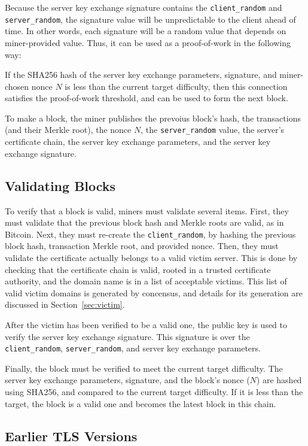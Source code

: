 Because the server key exchange signature contains the \texttt{client\_random}
and \texttt{server\_random}, the signature value will be unpredictable to the
client ahead of time. In other words, each signature will be a random value that
depends on miner-provided value. Thus, it can be used as a proof-of-work in the
following way:

If the SHA256 hash of the server key exchange parameters, signature, and
miner-chosen nonce $N$ is less than the current target difficulty, then this
connection satisfies the proof-of-work threshold, and can be used to form the
next block.

To make a block, the miner publishes the prevoius block's hash, the transactions
(and their Merkle root), the nonce $N$, the \texttt{server\_random} value, the
server's certificate chain, the server key exchange parameters, and the server
key exchange signature.

\subsection{Validating Blocks}

To verify that a block is valid, miners must validate several items. First, they
must validate that the previous block hash and Merkle roots are valid, as in
Bitcoin. Next, they must re-create the \texttt{client\_random}, by hashing the
previous block hash, transaction Merkle root, and provided nonce. Then, they
must validate the certificate actually belongs to a valid victim server. This is
done by checking that the certificate chain is valid, rooted in a trusted
certificate authority, and the domain name is in a list of acceptable victims.
This list of valid victim domains is generated by concensus, and details for its
generation are discussed in Section~\ref{sec:victim}.

After the victim has been verified to be a valid one, the public key is used to
verify the server key exchange signature. This signature is over the
\texttt{client\_random}, \texttt{server\_random}, and server key exchange
parameters.

Finally, the block must be verified to meet the current target difficulty. The
server key exchange parameters, signature, and the block's nonce ($N$) are
hashed using SHA256, and compared to the current target difficulty. If it is
less than the target, the block is a valid one and becomes the latest block in
this chain.

\subsection{Earlier TLS Versions}

